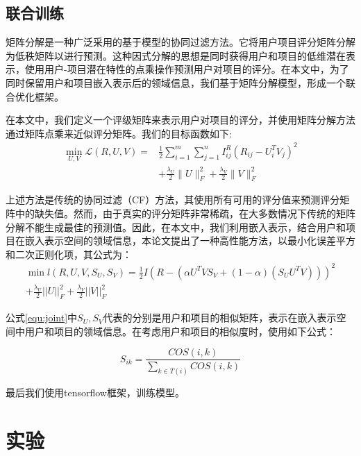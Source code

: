 \documentclass[lang=cn,11pt]{elegantpaper}
\begin{document}
\subsection{联合训练}

矩阵分解是一种广泛采用的基于模型的协同过滤方法。它将用户项目评分矩阵分解为低秩矩阵以进行预测。这种因式分解的思想是同时获得用户和项目的低维潜在表示，使用用户-项目潜在特性的点乘操作预测用户对项目的评分。在本文中，为了同时保留用户和项目嵌入表示后的领域信息，我们基于矩阵分解模型，形成一个联合优化框架。

在本文中，我们定义一个评级矩阵来表示用户对项目的评分，并使用矩阵分解方法通过矩阵点乘来近似评分矩阵。我们的目标函数如下:
\begin{equation} \label{equ:joint}
\begin{aligned} \min _{U, V} \mathcal{L}(R, U, V)=& \frac{1}{2} \sum_{i=1}^{m} \sum_{j=1}^{n} I_{i j}^{R}\left(R_{i j}-U_{i}^{T} V_{j}\right)^{2} \\ &+\frac{\lambda_{U}}{2}\|U\|_{F}^{2}+\frac{\lambda_{V}}{2}\|V\|_{F}^{2} \end{aligned}
\end{equation}

上述方法是传统的协同过滤（CF）方法，其使用所有可用的评分值来预测评分矩阵中的缺失值。然而，由于真实的评分矩阵非常稀疏，在大多数情况下传统的矩阵分解不能生成最佳的预测值。因此，在本文中，我们利用嵌入表示，结合用户和项目在嵌入表示空间的领域信息，本论文提出了一种高性能方法，以最小化误差平方和二次正则化项，其公式为：
\begin{equation} \label{equ:joint}
\begin{array}{c}
\min l(R,U,V,{S_U},{S_V}) = \frac{1}{2}I{(R - (\alpha  {U^T}V{S_V} +  (1 - \alpha )({S_U} {U^T}V) ))^2}\\
+ \frac{{{\lambda _U}}}{2}||U||_F^2 + \frac{{{\lambda _V}}}{2}||V||_F^2
\end{array}
\end{equation}

公式\ref{equ:joint}中${S_U},{S_V}$代表的分别是用户和项目的相似矩阵，表示在嵌入表示空间中用户和项目的领域信息。在考虑用户和项目的相似度时，使用如下公式：

\begin{equation}
S_{ik} = \frac{COS(i,k)}{\sum_{k \in T(i)} COS(i,k)} 
\end{equation}

最后我们使用tensorflow框架，训练模型。

\section{实验}
\end{document}

